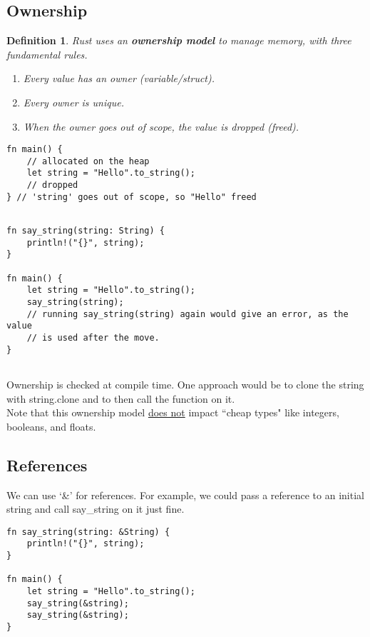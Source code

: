 \documentclass[12pt]{amsart}
\newtheorem{definition}{Definition}
\begin{document}
\subsection{Ownership}

\begin{definition}
Rust uses an \textbf{ownership model} to manage memory, with three fundamental rules.
\begin{enumerate}
\item Every value has an owner (variable/struct).
\item Every owner is unique.
\item When the owner goes out of scope, the value is dropped (freed).
\end{enumerate}
\end{definition}

\begin{lstlisting}
fn main() {
    // allocated on the heap
    let string = "Hello".to_string();
    // dropped
} // 'string' goes out of scope, so "Hello" freed


\end{lstlisting}


\begin{lstlisting}
fn say_string(string: String) {
    println!("{}", string);
}

fn main() {
    let string = "Hello".to_string();
    say_string(string);
    // running say_string(string) again would give an error, as the value
    // is used after the move.
} 


\end{lstlisting}

Ownership is checked at compile time. One approach would be to clone the string with string.clone and to then call the function on it. \\

Note that this ownership model \underline{does not} impact ``cheap types" like integers, booleans, and floats.

\subsection{References}
We can use `\&' for references. For example, we could pass a reference to an initial string and call say\_string on it just fine.

\begin{lstlisting}
fn say_string(string: &String) {
    println!("{}", string);
}

fn main() {
    let string = "Hello".to_string();
    say_string(&string);
    say_string(&string);
}
\end{lstlisting} 
    
\end{document}
